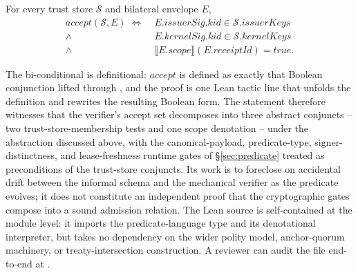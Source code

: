 \begin{theorem}
For every trust store $\mathcal{S}$ and bilateral envelope $E$,
\begin{align*}
  \mathit{accept}(\mathcal{S},E) \;\Longleftrightarrow\;
    & E.\mathit{issuerSig}.\mathit{kid} \in \mathcal{S}.\mathit{issuerKeys} \\
    {}\wedge{} & E.\mathit{kernelSig}.\mathit{kid} \in \mathcal{S}.\mathit{kernelKeys} \\
    {}\wedge{} & \llbracket E.\mathit{scope}\rrbracket(E.\mathit{receiptId}) = \mathit{true}.
\end{align*}
\end{theorem}

The bi-conditional is definitional: $\mathit{accept}$ is defined as exactly that Boolean conjunction lifted through , and the proof is one Lean tactic line that unfolds the definition and rewrites the resulting Boolean form. The statement therefore witnesses that the verifier's accept set decomposes into three abstract conjuncts -- two trust-store-membership tests and one scope denotation -- under the abstraction discussed above, with the canonical-payload, predicate-type, signer-distinctness, and lease-freshness runtime gates of \S\ref{sec:predicate} treated as preconditions of the trust-store conjuncts. Its work is to foreclose on accidental drift between the informal schema and the mechanical verifier as the predicate evolves; it does not constitute an independent proof that the cryptographic gates compose into a sound admission relation. The Lean source is self-contained at the module level: it imports the predicate-language type and its denotational interpreter, but takes no dependency on the wider polity model, anchor-quorum machinery, or treaty-intersection construction. A reviewer can audit the file end-to-end at .

